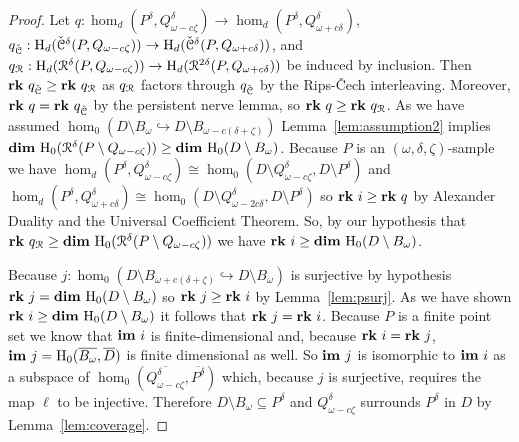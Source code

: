 \begin{proof}
  Let $q : \hom_d(P^\delta, Q_{\omega-c\zeta}^\delta)\to \hom_d(P^\delta, Q_{\omega+c\delta}^\delta)$,
  $q_{\check{\mathcal{C}}} : \mathrm{H}_d(\check{\mathcal{C}}^{\delta}(P, Q_{\omega-c\zeta}))\to\mathrm{H}_d(\check{\mathcal{C}}^{\delta}(P, Q_{\omega+c\delta}))$, and
  $q_{\mathcal{R}} : \mathrm{H}_d(\mathcal{R}^{\delta}(P, Q_{\omega-c\zeta}))\to\mathrm{H}_d(\mathcal{R}^{2\delta}(P, Q_{\omega+c\delta}))$ be induced by inclusion.
  Then $\mathbf{rk}~q_{\check{\mathcal{C}}} \geq\mathbf{rk}~q_{\mathcal{R}}$ as $q_{\mathcal{R}}$ factors through $q_{\check{\mathcal{C}}}$ by the Rips-\v Cech interleaving.
  Moreover, $\mathbf{rk}~q = \mathbf{rk}~q_{\check{\mathcal{C}}}$ by the persistent nerve lemma, so $\mathbf{rk}~q\geq \mathbf{rk}~q_{\mathcal{R}}$.
  As we have assumed $\hom_0(D\setminus B_\omega\hookrightarrow D\setminus B_{\omega-c(\delta+\zeta)})$ Lemma~\ref{lem:assumption2} implies $\mathbf{dim}~\mathrm{H}_0(\mathcal{R}^\delta(P\setminus Q_{\omega-c\zeta}))\geq \mathbf{dim}~\mathrm{H}_0(D\setminus B_\omega)$.
  Because $P$ is an $(\omega, \delta, \zeta)$-sample we have $\hom_d(P^\delta, Q_{\omega-c\zeta}^\delta)\cong \hom_0(D\setminus Q_{\omega-c\zeta}^\delta, D\setminus P^\delta)$ and $\hom_d(P^\delta, Q_{\omega+c\delta}^\delta)\cong \hom_0(D\setminus Q_{\omega-2c\delta}^\delta, D\setminus P^\delta)$ so $\mathbf{rk}~i\geq \mathbf{rk}~q$ by Alexander Duality and the Universal Coefficient Theorem.
  So, by our hypothesis that $\mathbf{rk}~q_{\mathcal{R}}\geq\mathbf{dim}~\mathrm{H}_0(\mathcal{R}^\delta(P\setminus Q_{\omega-c\zeta}))$ we have $\mathbf{rk}~i\geq\mathbf{dim}~\mathrm{H}_0(D\setminus B_\omega)$.

  Because $j : \hom_0(D\setminus B_{\omega+c(\delta+\zeta)}\hookrightarrow D\setminus B_\omega)$ is surjective by hypothesis $\mathbf{rk}~j = \mathbf{dim}~\mathrm{H}_0(D\setminus B_\omega)$ so $\mathbf{rk}~j\geq \mathbf{rk}~i$ by Lemma~\ref{lem:psurj}.
  As we have shown $\mathbf{rk}~i\geq \mathbf{dim}~\mathrm{H}_0(D\setminus B_\omega)$ it follows that $\mathbf{rk}~j = \mathbf{rk}~i$.
  Because $P$ is a finite point set we know that $\mathbf{im}~i$ is finite-dimensional and, because $\mathbf{rk}~i = \mathbf{rk}~j$, $\mathbf{im}~j=\mathrm{H}_0(\overline{B_\omega}, \overline{D})$ is finite dimensional as well.
  So $\mathbf{im}~j$ is isomorphic to $\mathbf{im}~i$ as a subspace of $\hom_0(\overline{Q_{\omega-c\zeta}^\delta}, \overline{P^\delta})$ which, because $j$ is surjective, requires the map $\ell$ to be injective.
  Therefore $D\setminus B_\omega\subseteq P^\delta$ and $Q_{\omega-c\zeta}^\delta$ surrounds $P^\delta$ in $D$ by Lemma~\ref{lem:coverage}.
\end{proof}


